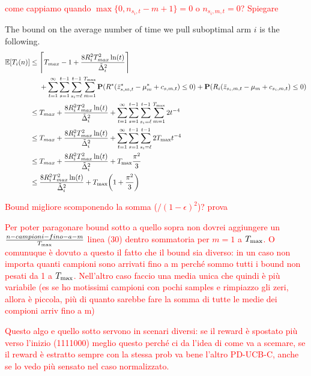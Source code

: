 \textcolor{red}{come cappiamo quando $\max{\{0,n_{s_i,t}-m+1\}}=0$ o $n_{s_i,m,t}=0$? Spiegare}

The bound on the average number of time we pull suboptimal arm $i$ is the following.
\begin{align}
	\mathbb{E}[T_i(n)] &\le \ceil[\Bigg]{T_{max}-1+ \frac{8 R_i^2 T_{max}^2 \ln(t)}{\tilde{\Delta}_i^2}} \nonumber\\ &~~~~+ \sum_{t=1}^\infty \sum_{s=1}^{t-1} \sum_{s_i=\ell}^{t-1} \sum_{m=1}^{\Tmax} \mathbf{P}(R^*(\bar{z}^*_{s,m,t} - \mu^*_m + c_{s,m,t}) \le 0) + \mathbf{P}(R_i(\bar{z}_{s_i,m,t} - \mu_m + c_{s_i,m,t}) \le 0)  \nonumber \\
	&\le T_{max} + \frac{8 R_i^2 T_{max}^2 \ln(t)}{\tilde{\Delta}_i^2} + \sum_{t=1}^\infty \sum_{s=1}^{t-1} \sum_{s_i=\ell}^{t-1} \sum_{m=1}^{\Tmax} 2t^{-4} \nonumber \\
	&\le T_{max} + \frac{8 R_i^2 T_{max}^2 \ln(t)}{\tilde{\Delta}_i^2} + \sum_{t=1}^\infty \sum_{s=1}^{t-1} \sum_{s_i=\ell}^{t-1} 2\Tmax t^{-4} \nonumber \\
	&\le T_{max} + \frac{8 R_i^2 T_{max}^2 \ln(t)}{\tilde{\Delta}_i^2} + \Tmax \frac{\pi^2}{3} \nonumber \\
	&\le \frac{8 R_i^2 T_{max}^2 \ln(t)}{\tilde{\Delta}_i^2} + \Tmax \bigg(1+ \frac{\pi^2}{3} \bigg) \nonumber 
\end{align}

\textcolor{red}{Bound migliore scomponendo la somma ($/(1-\epsilon)^2$)? prova}

\textcolor{red}{Per poter paragonare bound sotto a quello sopra non dovrei aggiungere un $\frac{n-campioni-fino-a-m}{\Tmax}$ linea (30) dentro sommatoria per $m=1$ a $\Tmax$. O comunuque è dovuto a questo il fatto che il bound sia diverso: in un caso non importa quanti campioni sono arrivati fino a m perché sommo tutti i bound non pesati da 1 a $\Tmax$. Nell'altro caso faccio una media unica che quindi è più variabile (es se ho motissimi campioni con pochi samples e rimpiazzo gli zeri, allora è piccola, più di quanto sarebbe fare la somma di tutte le medie dei compioni arriv fino a m)}

\textcolor{red}{Questo algo e quello sotto servono in scenari diversi: se il reward è spostato più verso l'inizio (1111000) meglio questo perché ci da l'idea di come va a scemare, se il reward è estratto sempre con la stessa prob va bene l'altro PD-UCB-C, anche se lo vedo più sensato nel caso normalizzato.}

